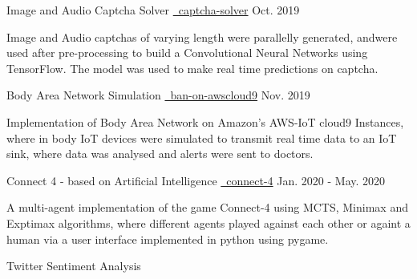 \begin{cventries}
   \cvproject
    {Image and Audio Captcha Solver}
    {
    {}
    {\href{https://github.com/mukeshmk/image-audio-captcha}
    {\faGithubSquare\ captcha-solver}}
    }
    {Oct. 2019}
    {
      \begin{cvitems}
      \vspace{-0.5ex}
        Image and Audio captchas of varying length were parallelly generated, andwere used after pre-processing to build a Convolutional Neural Networks using TensorFlow. The model was used to make real time predictions on captcha.
      \end{cvitems}
    }
  \cvproject
    {Body Area Network Simulation}
    {
    {}
    {\href{https://github.com/mukeshmk/ban-on-awscloud9}{\faGithubSquare\ ban-on-awscloud9}}
    }
    {Nov. 2019}
    {
       \begin{cvitems}
       \vspace{-0.5ex}
       Implementation of Body Area Network on Amazon's AWS-IoT cloud9 Instances, where in body IoT devices were simulated to transmit real time data to an IoT sink, where data was analysed and alerts were sent to doctors.  
      \end{cvitems}
    }
  \cvproject
    {Connect 4 - based on Artificial Intelligence}
    {
    {}
    {\href{https://github.com/mukeshmk/connect-4}{\faGithubSquare\ connect-4}}
    }
    {Jan. 2020 - May. 2020}
    {
      \begin{cvitems}
      \vspace{-0.5ex}
      A multi-agent implementation of the game Connect-4 using MCTS, Minimax and Exptimax algorithms, where different agents played against each other or againt a human via a user interface implemented in python using pygame.
      \end{cvitems}
    }
  \cvproject
    {Twitter Sentiment Analysis}

\end{cventries}

